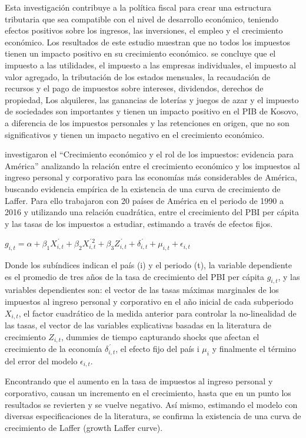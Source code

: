 \documentclass[
  letterpaper,
  DIV=11,
  numbers=noendperiod]{scrartcl}
\begin{document}
Esta investigación contribuye a la política fiscal para crear una
estructura tributaria que sea compatible con el nivel de desarrollo
económico, teniendo efectos positivos sobre los ingresos, las
inversiones, el empleo y el crecimiento económico. Los resultados de
este estudio muestran que no todos los impuestos tienen un impacto
positivo en su crecimiento económico. se concluye que el impuesto a las
utilidades, el impuesto a las empresas individuales, el impuesto al
valor agregado, la tributación de los estados mensuales, la recaudación
de recursos y el pago de impuestos sobre intereses, dividendos, derechos
de propiedad, Los alquileres, las ganancias de loterías y juegos de azar
y el impuesto de sociedades son importantes y tienen un impacto positivo
en el PIB de Kosovo, a diferencia de los impuestos personales y las
retenciones en origen, que no son significativos y tienen un impacto
negativo en el crecimiento económico.

\textcite{chiappelo_crecimiento_2018} investigaron el ``Crecimiento
económico y el rol de los impuestos: evidencia para América'' analizando
la relación entre el crecimiento económico y los impuestos al ingreso
personal y corporativo para las economías más considerables de América,
buscando evidencia empírica de la existencia de una curva de crecimiento
de Laffer. Para ello trabajaron con 20 países de América en el periodo
de 1990 a 2016 y utilizando una relación cuadrática, entre el
crecimiento del PBI per cápita y las tasas de los impuestos a estudiar,
estimando a través de efectos fijos.

\(g_{i, t} = \alpha + \beta_{1}X_{i, t}^{´} + \beta_{2}X_{i, t}^{´2} + \beta_{3}Z_{i, t}^{´} + \delta_{i, t}^{´} + \mu_{i, t} + \epsilon_{i, t}\)

Donde los subíndices indican el país (i) y el periodo (t), la variable
dependiente es el promedio de tres años de la tasa de crecimiento del
PBI per cápita \(g_{i, t}\), y las variables dependientes son: el vector
de las tasas máximas marginales de los impuestos al ingreso personal y
corporativo en el año inicial de cada subperiodo \(X_{i, t}\), el factor
cuadrático de la medida anterior para controlar la no-linealidad de las
tasas, el vector de las variables explicativas basadas en la literatura
de crecimiento \(Z_{i, t}\), dummies de tiempo capturando shocks que
afectan el crecimiento de la economía \(\delta_{i, t}^{´}\), el efecto
fijo del país i \(\mu_{i}\) y finalmente el término del error del modelo
\(\epsilon_{i, t}\).

Encontrando que el aumento en la tasa de impuestos al ingreso personal y
corporativo, causan un incremento en el crecimiento, hasta que en un
punto los resultados se revierten y se vuelve negativo. Así mismo,
estimando el modelo con diversas especificaciones de la literatura, se
confirma la existencia de una curva de crecimiento de Laffer (growth
Laffer curve).
\end{document}
